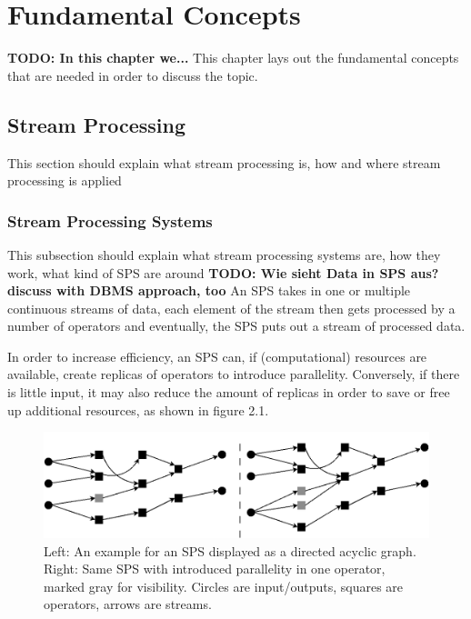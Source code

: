 \chapter{Fundamental Concepts}
\textbf{TODO: In this chapter we...}
This chapter lays out the fundamental concepts that are needed in order to discuss the topic.

    \section{Stream Processing}
    This section should explain what stream processing is, how and where stream processing is applied
    
        \subsection{Stream Processing Systems}
        This subsection should explain what stream processing systems are, how they work, what kind of SPS are around
        \textbf{TODO: Wie sieht Data in SPS aus? discuss with DBMS approach, too}
        An SPS takes in one or multiple continuous streams of data, each element of the stream then gets processed by a number of operators and eventually, 
        the SPS puts out a stream of processed data.
    
        In order to increase efficiency, an SPS can, if (computational) resources are available, create replicas of operators to introduce parallelity. 
        Conversely, if there is little input, it may also reduce the amount of replicas in order to save or free up additional resources, as shown in figure 2.1.
        \begin{figure}[h]
        \centering
        \includegraphics[width=1.0\textwidth]{Bilder/sps_parallel_normal.png}
        \caption{
                Left: An example for an SPS displayed as a directed acyclic graph. 
                Right: Same SPS with introduced parallelity in one operator, marked gray for visibility. 
                Circles are input/outputs, squares are operators, arrows are streams.
                }
        \label{fig:sps_parallel_normal}
        \end{figure}
